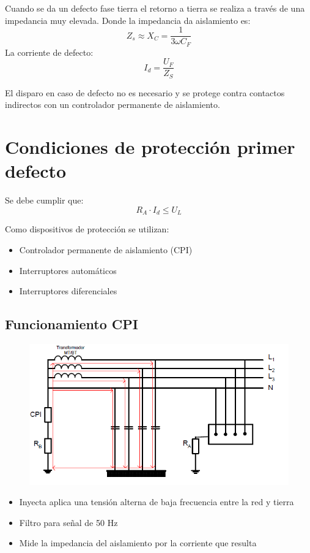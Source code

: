 Cuando se da un defecto fase tierra el retorno a tierra se realiza a través de una impedancia muy elevada. Donde la impedancia da aislamiento es:
\begin{equation}
	Z_s\approx X_C= \dfrac{1}{3\omega C_F}
\end{equation}
La corriente de defecto:
\begin{equation}
	I_d=\dfrac{U_F}{Z_S}
\end{equation}

El disparo en caso de defecto no es necesario y se protege contra contactos indirectos con un controlador permanente de aislamiento.

\section{Condiciones de protección primer defecto}
Se debe cumplir que:
\begin{equation}
	R_A\cdot I_d \le U_L
\end{equation}

Como dispositivos de protección se utilizan:
\begin{itemize}
	\item Controlador permanente de aislamiento (CPI)
	\item Interruptores automáticos
	\item Interruptores diferenciales
\end{itemize}

\subsection{Funcionamiento CPI}
\begin{figure}[H]
	\centering
	\includegraphics[width=0.7\linewidth]{Images/35}
	\label{fig:35}
\end{figure}

\begin{itemize}
	\item Inyecta aplica una tensión alterna de baja frecuencia entre la red y tierra
	\item Filtro para señal de 50 Hz
	\item Mide la impedancia del aislamiento por la corriente que resulta
\end{itemize}

